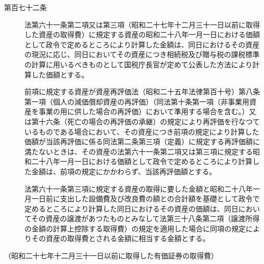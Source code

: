 \documentclass[twocolumn,a4j,10pt]{ltjtarticle}
\begin{document}
\begin{description}
\item[第百七十二条]法第六十一条第二項又は第三項（昭和二十七年十二月三十一日以前に取得した資産の取得費）に規定する資産の昭和二十八年一月一日における価額として政令で定めるところにより計算した金額は、同日におけるその資産の現況に応じ、同日においてその資産につき相続税及び贈与税の課税標準の計算に用いるべきものとして国税庁長官が定めて公表した方法により計算した価額とする。
\item[]前項に規定する資産が資産再評価法（昭和二十五年法律第百十号）第八条第一項（個人の減価償却資産の再評価）（同法第十条第一項（非事業用資産を事業の用に供した場合の再評価）において準用する場合を含む。）又は第十六条（死亡の場合の再評価の承継）の規定により再評価を行なつているものである場合において、その資産につき前項の規定により計算した価額が当該再評価に係る同法第二条第三項（定義）に規定する再評価額に満たないときは、その資産の法第六十一条第二項又は第三項に規定する昭和二十八年一月一日における価額として政令で定めるところにより計算した金額は、前項の規定にかかわらず、当該再評価額とする。
\item[]法第六十一条第三項に規定する資産の取得に要した金額と昭和二十八年一月一日前に支出した設備費及び改良費の額との合計額を基礎として政令で定めるところにより計算した同日におけるその資産の価額は、同日においてその資産の譲渡があつたものとみなして法第三十八条第二項（譲渡所得の金額の計算上控除する取得費）の規定を適用した場合に同項の規定によりその資産の取得費とされる金額に相当する金額とする。
\end{description}
\noindent\hspace{10pt}（昭和二十七年十二月三十一日以前に取得した有価証券の取得費）
\end{document}
